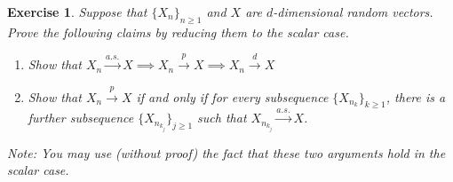 \documentclass[12pt]{article}
\theoremstyle{colon}
\newtheorem{exercise}{Exercise}
\begin{document}
\clearpage

\begin{exercise}
  Suppose that $\{ X_n \}_{n \geq 1}$ and $X$ are $d$-dimensional random vectors. Prove the following claims by reducing them to the scalar case.
  \begin{enumerate}[label=\arabic*)]
    \item Show that $X_n \xrightarrow{a.s.} X \implies X_n \xrightarrow{p} X \implies X_n \xrightarrow{d} X$
    \item Show that $X_n \xrightarrow{p} X$ if and only if for every subsequence $\{ X_{n_k} \}_{k \geq 1}$, there is a further subsequence $\{ X_{n_{k_j}} \}_{j \geq 1}$ such that $X_{n_{k_j}} \xrightarrow{a.s.} X$.
  \end{enumerate}
  Note: You may use (without proof) the fact that these two arguments hold in the scalar case.
\end{exercise}
\end{document}
